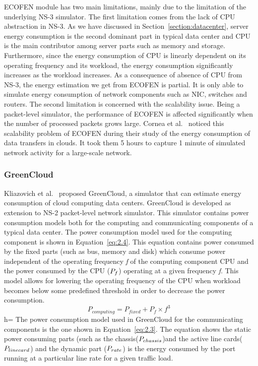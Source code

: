 ECOFEN module has two main limitations, mainly due to the limitation of the underlying NS-3 simulator. The first limitation comes from the lack of CPU abstraction in NS-3. As we have discussed in Section~\ref{section:datacenter}, server energy consumption is the second dominant part in typical data center and CPU is the main contributor among server parts such as memory and storage. Furthermore, since the energy consumption of CPU is linearly dependent on its operating frequency and its workload, the energy consumption significantly increases as the workload increases. As a consequence of absence of CPU from NS-3, the energy estimation we get from ECOFEN is partial. It is only able to simulate energy consumption of network components such as NIC, switches and routers. The second limitation is concerned with the scalability issue. Being a packet-level simulator, the performance of ECOFEN is affected significantly when the number of processed packets grows large. Cornea et al.{\ }\cite{DBLP:conf/cloudnet/CorneaOL14} noticed this scalability problem of ECOFEN during their study of the energy consumption of data transfers in clouds. It took them 5 hours to capture 1 minute of simulated network activity for a large-scale network.
 
\subsubsection{GreenCloud}
Kliazovich et al.{\ }\cite{DBLP:journals/tjs/KliazovichBK12} proposed GreenCloud, a simulator that can estimate energy consumption of cloud computing data centers. GreenCloud is developed as extension to NS-2 packet-level network simulator. This simulator contains power consumption models both for the computing and communicating components of a typical data center. The power consumption model used for the computing component is shown in Equation~\ref{eq:2.4}. This equation contains power consumed by the fixed parts (such as bus, memory and disk) which consume power independent of the operating frequency \emph{f} of the computing component CPU and the power consumed by the CPU (\($$P_f$$\)) operating at a given frequency \emph{f}. This model allows for lowering the operating frequency of the CPU when workload becomes below some predefined threshold in order to decrease the power consumption. 
\begin{equation} \label{eq:2.4}
P_{computing} = P_{fixed} + P_f \times f^3
\end{equation}h=
The power consumption model used in GreenCloud for the communicating components is the one shown in Equation~\ref{eq:2.3}. The equation shows the static power consuming parts (such as the chassis(\($$P_{chassis}$$\))and the active line cards(\($$P_{linecard}$$\)) and the dynamic part (\($$P_{rate}$$\)) is the energy consumed by the port running at a particular line rate for a given traffic load. 

